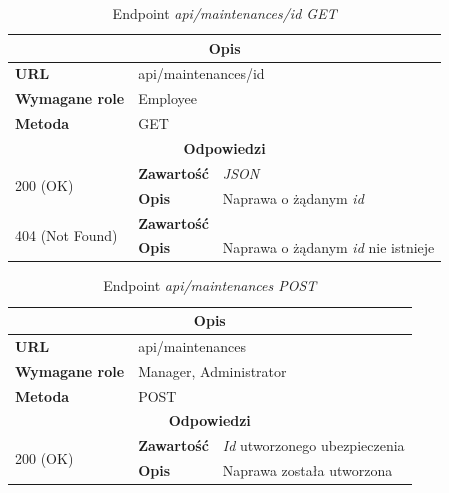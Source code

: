 \documentclass[eng,printmode,openany]{mgr}
\begin{document}
	\begin{table}[H]
		\caption{Endpoint \textit{api/maintenances/id GET}}
		\begin{tabularx}{\textwidth}{|l|l|X|}
			\hline
			\multicolumn{3}{|c|}{\textbf{\textbf{Opis}}}
			\\ \hline
			\textbf{URL}                         & \multicolumn{2}{l|}{api/maintenances/id}
			\\ \hline
			\textbf{Wymagane role}               & \multicolumn{2}{l|}{Employee}
			\\ \hline
			\textbf{Metoda}                      & \multicolumn{2}{l|}{GET}
			\\ \hline
			\multicolumn{3}{|c|}{\textbf{Odpowiedzi}}
			\\ \hline
			\multirow{2}{*}{200 (OK)} 	        & \textbf{Zawartość}   	& \textit{JSON}
			\\ \cline{2-3}                      & \textbf{Opis}         	& Naprawa o żądanym \textit{id}
			\\ \hline
			\multirow{2}{*}{404 (Not Found)} 	& \textbf{Zawartość}     & 
			\\ \cline{2-3}                      & \textbf{Opis}          & Naprawa o żądanym \textit{id} nie istnieje
			\\ \hline
		\end{tabularx}
	\end{table}
	
	\begin{table}[H]
		\caption{Endpoint \textit{api/maintenances POST}}
		\begin{tabularx}{\textwidth}{|l|l|X|}
			\hline
			\multicolumn{3}{|c|}{\textbf{\textbf{Opis}}}
			\\ \hline
			\textbf{URL}                       & \multicolumn{2}{l|}{api/maintenances}
			\\ \hline
			\textbf{Wymagane role}             & \multicolumn{2}{l|}{Manager, Administrator}
			\\ \hline
			\textbf{Metoda}                    & \multicolumn{2}{l|}{POST}
			\\ \hline
			\multicolumn{3}{|c|}{\textbf{Odpowiedzi}}
			\\ \hline
			\multirow{2}{*}{200 (OK)} 		& \textbf{Zawartość}     & \textit{Id} utworzonego ubezpieczenia
			\\ \cline{2-3}                  & \textbf{Opis}         	& Naprawa została utworzona
			\\ \hline
		\end{tabularx}
	\end{table}
	
\end{document}
